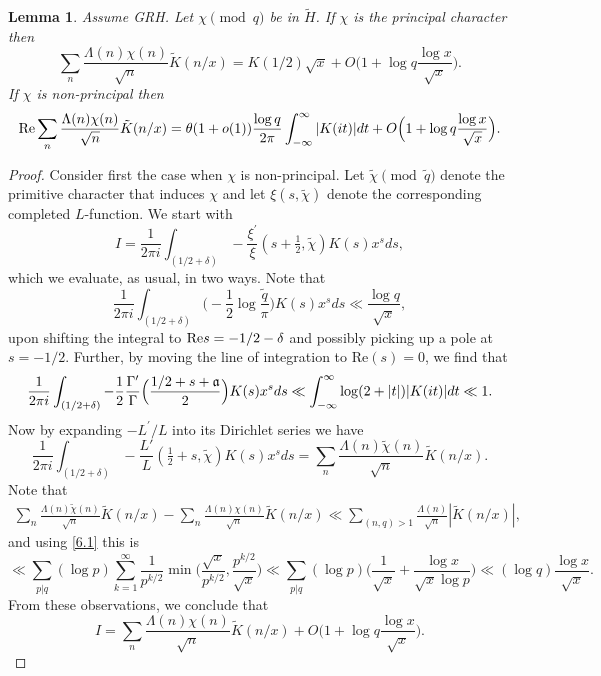 \documentclass [12pt]{amsart}
\newtheorem{lemma}{Lemma}[section]
\numberwithin{equation}{section}
\newcommand{\tRe}{\textup{Re}}
\begin{document}
 \begin{lemma} 
 \label{lemma6.1}  Assume GRH.  
 Let $\chi \pmod q$ be in ${\tilde H}$.   If $\chi$ is the principal character 
 then 
  $$ 
 \sum_{n} \frac{\Lambda(n) \chi(n)}{\sqrt{n}} {\tilde K}(n/x) = K(1/2){\sqrt{x}} + 
 O\Big(1+ \log q\frac{\log x}{\sqrt{x}} \Big). 
 $$ 
 If $\chi$ is non-principal then  
 $$ 
\textup{Re} \sum_{n} \frac{\Lambda(n)\chi(n)}{\sqrt{n}} {\tilde K}(n/x) = \theta (1+o(1)) 
\frac{\log q}{2\pi } \int_{-\infty}^{\infty} |K(it)|dt  + O\Big(1+ \log q \frac{\log x}{\sqrt{x}}\Big). 
 $$ 
 \end{lemma} 
 \begin{proof}   Consider first the case when $\chi$ is non-principal.  Let ${\tilde \chi} \pmod{\tilde q}$ denote 
 the primitive character that induces $\chi$ and let 
 $\xi(s,\tilde{\chi})$ denote the corresponding completed $L$-function. We 
 start with  
 \begin{equation} 
 \label{6.2} 
I= \frac{1}{2\pi i} 
 \int_{(1/2+\delta)} -\frac{\xi^{\prime}}{\xi}(s+\tfrac 12,\tilde \chi) K(s) x^s  ds,
 \end{equation}
 which we evaluate, as usual, in two ways.  Note that 
 $$ 
 \frac{1}{2\pi i} \int_{(1/2+\delta)} \Big( -\frac 12 \log \frac{\tilde q}{\pi}  \Big) K(s) x^s ds   \ll \frac{\log q}{\sqrt{x}},
 $$
 upon shifting the integral to $\tRe s = -1/2 -\delta$ and possibly picking up a pole at $s=-1/2$.
Further, by moving the line of integration to Re$(s)=0$, we find that 
$$ 
 \frac{1}{2\pi i} \int_{(1/2+\delta)} -\frac 12 \frac{\Gamma^{\prime}}{\Gamma}\Big(
 \frac{1/2+s+{\frak a}}{2}\Big) K(s) x^s ds \ll \int_{-\infty}^{\infty} \log (2+|t|) |K(it)| dt \ll 1.
 $$
Now by expanding $-L^{\prime}/L$ into its Dirichlet series we have 
 $$ 
 \frac{1}{2\pi i} \int_{(1/2+\delta)} -\frac{L'}{L}(\tfrac 12+s,\tilde\chi) K(s) x^s ds =  \sum_{n} \frac{\Lambda(n){\tilde \chi}(n)}{\sqrt{n}} {\tilde K}(n/x).
 $$ 
 Note that 
 \begin{align*}
 \sum_{n} \frac{\Lambda(n){\tilde \chi}(n)}{\sqrt{n}} {\tilde K}(n/x) 
- \sum_{n} \frac{\Lambda(n)\chi(n)}{\sqrt{n}} {\tilde K}(n/x)
 \ll \sum_{(n,q)>1} \frac{\Lambda(n)}{\sqrt{n}} |{\tilde K}(n/x)|, 
\end{align*}
 and using \eqref{6.1} this is 
 $$ 
 \ll \sum_{p|q} (\log p) \sum_{k=1}^{\infty} \frac{1}{p^{k/2}} \min \Big( \frac{\sqrt{x}}{p^{k/2}}, 
\frac{p^{k/2}}{\sqrt{x}}\Big) \ll \sum_{p|q} (\log p) \Big(\frac{1}{\sqrt{x}} + \frac{\log x}{\sqrt{x}\log p}\Big)\ll (\log q) \frac{\log x}{\sqrt{x}}. 
 $$
 From these observations, we conclude that  
 \begin{equation} 
 \label{6.3} 
 I=\sum_{n} \frac{\Lambda(n)\chi(n)}{\sqrt{n}} {\tilde K}(n/x) + O\Big(1+\log q \frac{\log x}{\sqrt{x}}\Big). 
 \end{equation} 
 

\end{proof}
\end{document}

